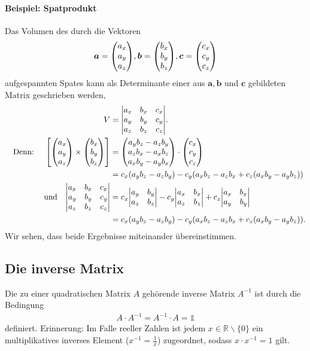 \paragraph{Beispiel: Spatprodukt} Das Volumen des durch die Vektoren 
\begin{align}
    \bm{a} = \mqty(a_x\\a_y\\a_z), \bm{b} = \mqty(b_x\\b_y\\b_z), \bm{c} = \mqty(c_x\\c_y\\c_z)
\end{align}
aufgespannten Spates kann als Determinante einer aus $\bm{a},\bm{b}$ und $\bm{c}$ gebildeten Matrix geschrieben werden, 
\begin{align}
    V &= \mqty|a_x & b_x&c_x\\a_y&b_y&c_y\\a_z&b_z&c_z|.\\
\qq{Denn: } \qty[\mqty(a_x\\a_y\\a_z)\times\mqty(b_x\\b_y\\b_z)] &= \mqty(a_yb_z-a_zb_y \\ a_zb_x-a_xb_z\\a_xb_y-a_yb_x)\cdot\mqty(c_x\\c_y\\c_z) \notag \\
&= c_x(a_yb_z-a_zb_y) - c_y(a_xb_z-a_zb_x + c_z(a_xb_y-a_yb_z)) \notag \\
\qq{und} \mqty|a_x & b_x&c_x\\a_y&b_y&c_y\\a_z&b_z&c_z| &= c_x \mqty|a_y &b_y\\a_z&b_z| - c_y\mqty|a_x&b_x\\a_z&b_z|+c_z \mqty|a_x&b_x\\a_y&b_y| \notag \\
&=c_x(a_yb_z-a_zb_y) - c_y(a_xb_z-a_zb_x + c_z(a_xb_y-a_yb_z)).
\end{align}
Wir sehen, dass beide Ergebnisse miteinander übereinstimmen.

\newpage
\subsection{Die inverse Matrix}

Die zu einer quadratischen Matrix $A$ gehörende inverse Matrix $A^{-1}$ ist durch die Bedingung 
\begin{align}
    A \cdot A^{-1} = A^{-1}\cdot A = \mathds{1}
\end{align}
definiert. Erinnerung: Im Falle reeller Zahlen ist jedem $x\in\mathbb{R}\backslash\{0\}$ ein multiplikatives inverses Element ($x^{-1} = \frac{1}{x}$) zugeordnet, sodass $x\cdot x^{-1} = 1$ gilt.

